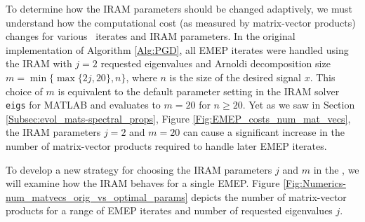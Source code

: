 To determine how the IRAM parameters should be changed adaptively, we must understand how the computational cost (as measured by matrix-vector products) changes for various \emep \ iterates and IRAM parameters.
In the original implementation of Algorithm \ref{Alg:PGD}, all EMEP iterates were handled using the IRAM with $j=2$ requested eigenvalues and Arnoldi decomposition size $m = \min \{  \max \{ 2j, 20 \}, n \}$, where $n$ is the size of the desired signal $x$.  
This choice of $m$ is equivalent to the default parameter setting in the IRAM solver \texttt{eigs} for MATLAB and evaluates to $m=20$ for $n \geq 20$.
Yet as we saw in Section \ref{Subsec:evol_mats-spectral_props}, Figure \ref{Fig:EMEP_costs_num_mat_vecs}, the IRAM parameters $j = 2$ and $m=20$ can cause a significant increase in the number of matrix-vector products required to handle later EMEP iterates.  


To develop a new strategy for choosing the IRAM parameters $j$ and $m$ in the \emep, we will examine how the IRAM behaves for a single EMEP.  
Figure \ref{Fig:Numerics-num_matvecs_orig_vs_optimal_params} depicts the number of matrix-vector products for a range of EMEP iterates and number of requested eigenvalues $j$.

